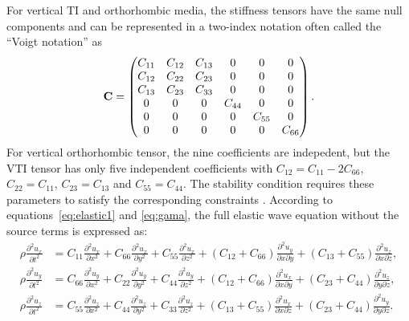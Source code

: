For vertical TI and orthorhombic media, the stiffness tensors have the same null components and can
be represented in a two-index notation \cite[]{musgrave} often called the “Voigt notation” as
\begin{equation}
\mathbf{C} =
\begin{pmatrix}C_{11} &C_{12} &C_{13} &0 &0 &0 \cr
         C_{12} &C_{22} &C_{23} &0 &0 &0 \cr
         C_{13} &C_{23} &C_{33} &0 &0 &0 \cr
         0& 0&  0 & C_{44} &0 &0 \cr
         0& 0&  0 &0 & C_{55} &0 \cr
         0& 0&  0 &0 &0 &C_{66}\end{pmatrix}.
\end{equation}
For vertical orthorhombic tensor, the nine coefficients are indepedent, but the VTI tensor has only 
five independent coefficients with $C_{12}=C_{11}-2C_{66}$, $C_{22}=C_{11}$, $C_{23}=C_{13}$ and $C_{55}=C_{44}$.
The stability condition requires these parameters to satisfy the corresponding constraints \cite[]{helbig:1994, tsvankin:2001}.
According to equations~\ref{eq:elastic1} and \ref{eq:gama}, the full elastic wave equation without the source terms is expressed as:
\begin{equation}
\begin{split}
\rho\frac{\partial^2{u_x}}{\partial t^2} &= C_{11}\frac{\partial^2{u_x}}{\partial x^2}
                                         + C_{66}\frac{\partial^2{u_x}}{\partial y^2}
                                         + C_{55}\frac{\partial^2{u_x}}{\partial z^2}
                                         +(C_{12}+C_{66})\frac{\partial^2{u_y}}{{\partial x}{\partial y}}
                                         +(C_{13}+C_{55})\frac{\partial^2{u_z}}{{\partial x}{\partial z}}, \\
\rho\frac{\partial^2{u_y}}{\partial t^2} &= C_{66}\frac{\partial^2{u_y}}{\partial x^2}
                                         + C_{22}\frac{\partial^2{u_y}}{\partial y^2}
                                         + C_{44}\frac{\partial^2{u_y}}{\partial z^2}
                                         +(C_{12}+C_{66})\frac{\partial^2{u_x}}{{\partial x}{\partial y}}
                                         +(C_{23}+C_{44})\frac{\partial^2{u_z}}{{\partial y}{\partial z}}, \\
\rho\frac{\partial^2{u_z}}{\partial t^2} &= C_{55}\frac{\partial^2{u_z}}{\partial x^2}
                                         + C_{44}\frac{\partial^2{u_z}}{\partial y^2}
                                         + C_{33}\frac{\partial^2{u_z}}{\partial z^2} 
                                         +(C_{13}+C_{55})\frac{\partial^2{u_x}}{{\partial x}{\partial z}}
                                         +(C_{23}+C_{44})\frac{\partial^2{u_y}}{{\partial y}{\partial z}}.
\end{split}
\end{equation}
